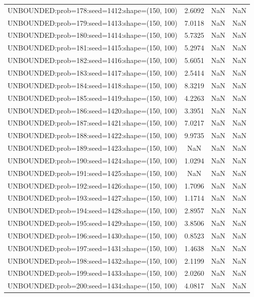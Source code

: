 \begin{longtable}{lccc}
UNBOUNDED:prob=178:seed=1412:shape=(150, 100) &  2.6092 &   NaN &    NaN \\
UNBOUNDED:prob=179:seed=1413:shape=(150, 100) &  7.0118 &   NaN &    NaN \\
UNBOUNDED:prob=180:seed=1414:shape=(150, 100) &  5.7325 &   NaN &    NaN \\
UNBOUNDED:prob=181:seed=1415:shape=(150, 100) &  5.2974 &   NaN &    NaN \\
UNBOUNDED:prob=182:seed=1416:shape=(150, 100) &  5.6051 &   NaN &    NaN \\
UNBOUNDED:prob=183:seed=1417:shape=(150, 100) &  2.5414 &   NaN &    NaN \\
UNBOUNDED:prob=184:seed=1418:shape=(150, 100) &  8.3219 &   NaN &    NaN \\
UNBOUNDED:prob=185:seed=1419:shape=(150, 100) &  4.2263 &   NaN &    NaN \\
UNBOUNDED:prob=186:seed=1420:shape=(150, 100) &  3.3951 &   NaN &    NaN \\
UNBOUNDED:prob=187:seed=1421:shape=(150, 100) &  7.0217 &   NaN &    NaN \\
UNBOUNDED:prob=188:seed=1422:shape=(150, 100) &  9.9735 &   NaN &    NaN \\
UNBOUNDED:prob=189:seed=1423:shape=(150, 100) &     NaN &   NaN &    NaN \\
UNBOUNDED:prob=190:seed=1424:shape=(150, 100) &  1.0294 &   NaN &    NaN \\
UNBOUNDED:prob=191:seed=1425:shape=(150, 100) &     NaN &   NaN &    NaN \\
UNBOUNDED:prob=192:seed=1426:shape=(150, 100) &  1.7096 &   NaN &    NaN \\
UNBOUNDED:prob=193:seed=1427:shape=(150, 100) &  1.1714 &   NaN &    NaN \\
UNBOUNDED:prob=194:seed=1428:shape=(150, 100) &  2.8957 &   NaN &    NaN \\
UNBOUNDED:prob=195:seed=1429:shape=(150, 100) &  3.8506 &   NaN &    NaN \\
UNBOUNDED:prob=196:seed=1430:shape=(150, 100) &  0.8523 &   NaN &    NaN \\
UNBOUNDED:prob=197:seed=1431:shape=(150, 100) &  1.4638 &   NaN &    NaN \\
UNBOUNDED:prob=198:seed=1432:shape=(150, 100) &  2.1199 &   NaN &    NaN \\
UNBOUNDED:prob=199:seed=1433:shape=(150, 100) &  2.0260 &   NaN &    NaN \\
UNBOUNDED:prob=200:seed=1434:shape=(150, 100) &  4.0817 &   NaN &    NaN \\

\end{longtable}

